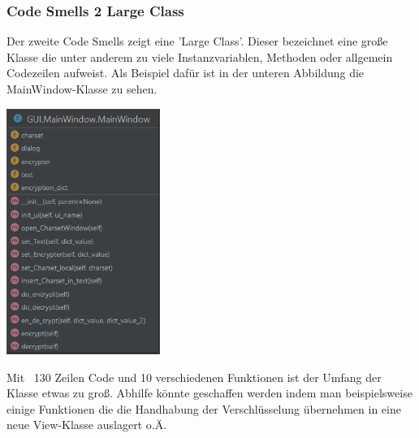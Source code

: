\documentclass[12pt]{article}
\begin{document}
\subsubsection{Code Smells 2 Large Class}
Der zweite Code Smells zeigt eine 'Large Class'. Dieser bezeichnet eine große Klasse die unter anderem zu viele Instanzvariablen, Methoden oder allgemein Codezeilen aufweist. Als Beispiel dafür ist in der unteren Abbildung die MainWindow-Klasse zu sehen.
\begin{center}
	\includegraphics[width=5cm]{bilder/CodeSmells3.png}
\end{center}
Mit ~130 Zeilen Code und 10 verschiedenen Funktionen ist der Umfang der Klasse etwas zu groß. Abhilfe könnte geschaffen werden indem man beispielsweise einige Funktionen die die Handhabung der Verschlüsselung übernehmen in eine neue View-Klasse auslagert o.Ä.
\end{document}
